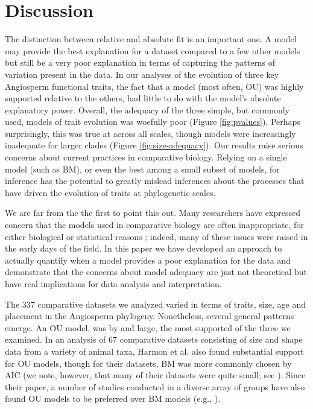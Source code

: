 \documentclass[a4paper,12pt]{article}
\begin{document}
\section{Discussion}

The distinction between relative and absolute fit is an important one. A model may provide the best explanation for a dataset compared to a few other models but still be a very poor explanation in terms of capturing the patterns of variation present in the data. 
In our analyses of the evolution of three key Angiosperm functional traits, the fact that a model (most often, OU) was highly supported relative to the others, had little to do with the model's absolute explanatory power. Overall, the adequacy of the three simple, but commonly used, models of trait evolution was woefully poor (Figure \ref{fig:pvalues}). Perhaps surprisingly, this was true at across all scales, though models were increasingly inadequate for larger clades (Figure \ref{fig:size-adequacy}). Our results raise serious concerns about current practices in comparative biology. Relying on a single model (such as BM), or even the best among a small subset of models, for inference has the potential to greatly mislead inferences about the processes that have driven the evolution of traits at phylogenetic scales.

We are far from the the first to point this out. Many researchers have expressed concern that the models used in comparative biology are often inappropriate, for either biological or statistical reasons \citep{Felsenstein1985, Felsenstein1988, HarveyPagel1991, Garland1992, Pagel1993, Diaz1996, HansenMartins1996, Price1997, Garland1999, GarlandIves2000, HansenOrzack2005, Hansen2012, Felsenstein2012, Boettiger2012, SlaterPennell}; indeed, many of these issues were raised in the early days of the field.
In this paper we have developed an approach to actually quantify when a model provides a poor explanation for the data and demonstrate that the concerns about model adequacy are just not theoretical but have real implications for data analysis and interpretation.

The 337 comparative datasets we analyzed varied in terms of traits, size, age and placement in the Angiosperm phylogeny. Nonetheless, several general patterns emerge. An OU model, was by and large, the most supported of the three we examined. In an analysis of 67 comparative datasets consisting of size and shape data from a variety of animal taxa, Harmon et al. \citep{Harmon2010} also found substantial support for OU models, though for their datasets, BM was more commonly chosen by AIC (we note, however, that many of their datasets were quite small; see \citep{SlaterPennell}). Since their paper, a number of studies conducted in a diverse array of groups have also found OU models to be preferred over BM models (e.g., \citep{Burbrink2012, Wiens2013, Lopez2013}). 
\end{document}
